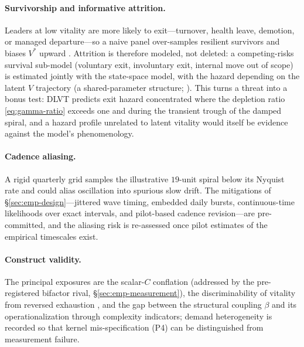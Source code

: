 \paragraph{Survivorship and informative attrition.}
Leaders at low vitality are more likely to exit---turnover, health leave,
demotion, or managed departure---so a naive panel over-samples resilient
survivors and biases $V^{*}$ upward
\citep{conference2023tenure,tu2025dancing,muller2026systematic}. Attrition
is therefore modeled, not deleted: a competing-risks survival sub-model
(voluntary exit, involuntary exit, internal move out of scope) is estimated
jointly with the state-space model, with the hazard depending on the latent
$V$ trajectory (a shared-parameter structure;
\citealp{rizopoulos2012joint}). This turns a threat into a
bonus test: DLVT predicts exit hazard concentrated where the depletion
ratio \eqref{eq:gamma-ratio} exceeds one and during the transient trough of
the damped spiral, and a hazard profile unrelated to latent vitality would
itself be evidence against the model's phenomenology.

\paragraph{Cadence aliasing.}
A rigid quarterly grid samples the illustrative $19$-unit spiral below its
Nyquist rate and could alias oscillation into spurious slow drift. The
mitigations of \S\ref{sec:emp-design}---jittered wave timing, embedded
daily bursts, continuous-time likelihoods over exact intervals, and
pilot-based cadence revision---are pre-committed, and the aliasing risk is
re-assessed once pilot estimates of the empirical timescales exist.

\paragraph{Construct validity.}
The principal exposures are the scalar-$C$ conflation (addressed by the
pre-registered bifactor rival, \S\ref{sec:emp-measurement}), the
discriminability of vitality from reversed exhaustion
\citep{maslach1981burnout}, and the gap between the structural coupling
$\beta$ and its operationalization through complexity indicators; demand
heterogeneity \citep{podsakoff2023challenge,ong2023configural,bakker2017jdr,
demerouti2001job} is recorded so that kernel mis-specification (P4) can be
distinguished from measurement failure.

